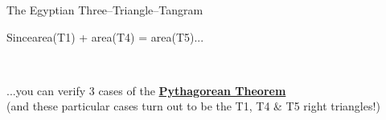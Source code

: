 \documentclass[14pt]{beamer}
\begin{document}
    \begin{frame}{The Egyptian Three--Triangle--Tangram}
        \begin{center}
            Since\quad area(T1) + area(T4) = area(T5)\quad...

            \bigskip \bigskip \bigskip

            \!\!\!\!
            \qquad
             \\

            \bigskip \bigskip

            ...you can verify 3 cases of the \textbf{\href{https://en.wikipedia.org/wiki/Pythagorean_theorem}{Pythagorean Theorem}}\\
            {\footnotesize (and these particular cases turn out to be the T1, T4 \& T5 right triangles!)}
        \end{center}
    \end{frame}
\end{document}
